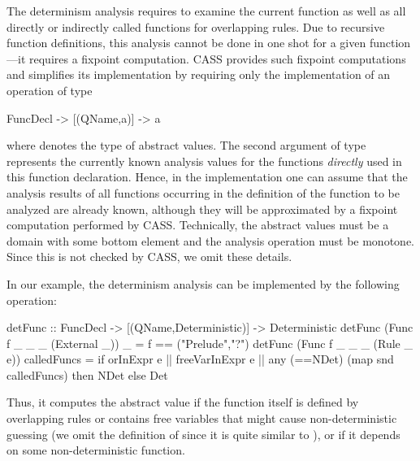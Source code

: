 The determinism analysis requires to examine the current
function as well as all directly or indirectly called functions
for overlapping rules.
Due to recursive function definitions, this analysis cannot be done
in one shot for a given function---it requires a fixpoint computation.
CASS provides such fixpoint computations and simplifies
its implementation by requiring only the implementation
of an operation of type
\begin{curry}
FuncDecl -> [(QName,a)] -> a
\end{curry}
where  denotes the type of abstract values.
The second argument of type \code{[(QName,a)]}
represents the currently known analysis values
for the functions \emph{directly} used in this function declaration.
Hence, in the implementation one can assume that the analysis
results of all functions occurring in the definition of
the function to be analyzed are already known, although they
will be approximated by a fixpoint computation performed by CASS.
Technically, the abstract values must be a domain with some
bottom element and the analysis operation must be monotone.
Since this is not checked by CASS, we omit these details.

In our example, the determinism analysis can be implemented
by the following operation:
\begin{curry}
detFunc :: FuncDecl -> [(QName,Deterministic)] -> Deterministic
detFunc (Func f _ _ _ (External _)) _           = f == ("Prelude","?")
detFunc (Func f _ _ _ (Rule _ e))   calledFuncs =
  if orInExpr e || freeVarInExpr e || any (==NDet) (map snd calledFuncs)
    then NDet
    else Det
\end{curry}
Thus, it computes the abstract value 
if the function itself is defined by overlapping rules or
contains free variables that might cause non-deterministic guessing
(we omit the definition of  since it is quite
similar to ), or
if it depends on some non-deterministic function.

